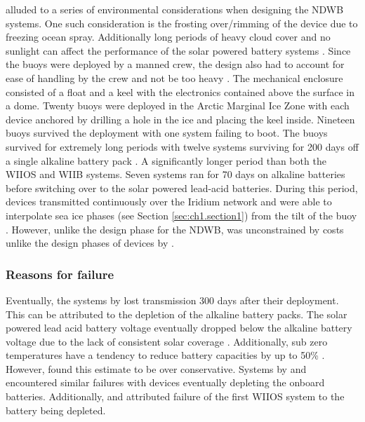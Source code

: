 \par \textcite{doble2017robust} alluded to a series of environmental considerations when designing the NDWB systems. One such consideration is the frosting over/rimming of the device due to freezing ocean spray. Additionally long periods of heavy cloud cover and no sunlight can affect the performance of the solar powered battery systems \cite{doble2017robust,lever2006solar}. Since the buoys were deployed by a manned crew, the design also had to account for ease of handling by the crew and not be too heavy \cite{doble2017robust}. The mechanical enclosure consisted of a float and a keel with the electronics contained above the surface in a dome. Twenty buoys were deployed in the Arctic Marginal Ice Zone with each device anchored by drilling a hole in the ice and placing the keel inside. Nineteen buoys survived the deployment with one system failing to boot. The buoys survived for extremely long periods with twelve systems surviving for 200 days off a single alkaline battery pack \cite{doble2017robust}. A significantly longer period than both the WIIOS and WIIB systems. Seven systems ran for 70 days on alkaline batteries before switching over to  the solar powered lead-acid batteries. During this period, devices transmitted continuously over the Iridium network and were able to interpolate sea ice phases (see Section \ref{sec:ch1.section1}) from the tilt of the buoy \cite{doble2017robust}. However, unlike the design phase for the NDWB, was unconstrained by costs unlike the design phases of devices by \textcite{rabault2019open,planck2019evolution,kohout2015device}. 

\subsubsection{Reasons for failure}
\label{ch2:sec3_failiure}

Eventually, the systems by \textcite{doble2017robust} lost transmission 300 days after their deployment. This can be attributed to the depletion of the alkaline battery packs. The solar powered lead acid battery voltage eventually dropped below the alkaline battery voltage due to the lack of consistent solar coverage \cite{doble2017robust}. Additionally, sub zero temperatures have a tendency to reduce battery capacities by up to 50\% \cite{doble2017robust}. However, \textcite{doble2017robust} found this estimate to be over conservative. Systems by \textcite{kohout2015device} and \textcite{doble2017robust} encountered similar failures with devices eventually depleting the onboard batteries. Additionally, \textcite{vichi2019effects} and \textcite{alberello2019drift} attributed failure of the first WIIOS system to the battery being depleted.\par 

